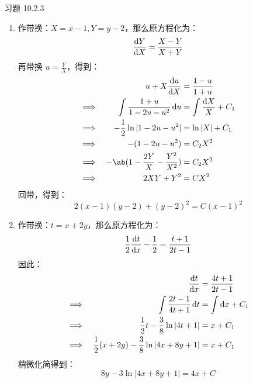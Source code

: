 \begin{problem}
    习题 10.2.3
    \begin{solution}
        \begin{enumerate}
            \item[\textbf{2)}] 作带换：$X = x - 1, Y = y - 2$，那么原方程化为：
            $$
            \dv{Y}{X} = \frac{X - Y}{X + Y}
            $$
            再带换 $u = \frac{Y}{X}$，得到：
            $$
            \begin{aligned}
                & & u + X \dv{u}{X} & = \frac{1 - u}{1 + u} \\
                \implies & & \int \frac{1 + u}{1 - 2u - u^2} \dd{u} & = \int \frac{\dd{X}}{X} + C_1 \\
                \implies & & -\frac{1}{2} \ln |1 - 2u - u^2| & = \ln |X| + C_1 \\
                \implies & & -(1 - 2u - u^2) & = C_2 X^2 \\
                \implies & & -\ab(1 - \frac{2Y}{X} - \frac{Y^2}{X^2}) & = C_2 X^2 \\
                \implies & & 2 X Y + Y^2 & = C X^2 
            \end{aligned}
            $$
            回带，得到：
            $$
            2 (x - 1) (y - 2) + (y - 2)^2 = C (x - 1)^2
            $$

            \item[\textbf{4)}] 作带换：$t = x + 2y$，那么原方程化为：
            $$
            \frac{1}{2} \dv{t}{x} - \frac{1}{2} = \frac{t + 1}{2t - 1}
            $$
            因此：
            $$
            \begin{aligned}
                & & \dv{t}{x} & = \frac{4t + 1}{2t - 1} \\
                \implies & & \int \frac{2t - 1}{4t + 1} \dd{t} & = \int \dd{x} + C_1 \\
                \implies & & \frac{1}{2} t - \frac{3}{8} \ln |4t + 1| & = x + C_1 \\
                \implies & & \frac{1}{2} (x + 2y) - \frac{3}{8} \ln |4x + 8y + 1| & = x + C_1
            \end{aligned}
            $$
            稍微化简得到：
            $$
            8y - 3 \ln |4x + 8y + 1| = 4x + C
            $$
        \end{enumerate}
    \end{solution}
\end{problem}


